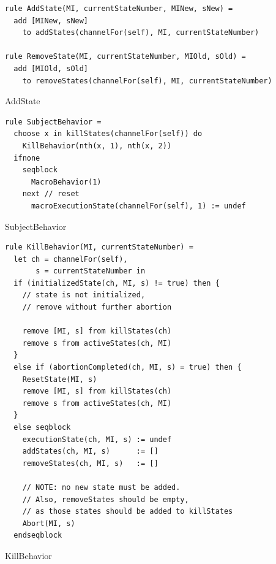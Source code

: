 \begin{listing}[H]
\begin{verbatim}
rule AddState(MI, currentStateNumber, MINew, sNew) =
  add [MINew, sNew]
    to addStates(channelFor(self), MI, currentStateNumber)

rule RemoveState(MI, currentStateNumber, MIOld, sOld) =
  add [MIOld, sOld]
    to removeStates(channelFor(self), MI, currentStateNumber)
\end{verbatim}
\caption{AddState}
\label{lst:asm:AddState}
\end{listing}







\begin{listing}[H]
\begin{verbatim}
rule SubjectBehavior =
  choose x in killStates(channelFor(self)) do
    KillBehavior(nth(x, 1), nth(x, 2))
  ifnone
    seqblock
      MacroBehavior(1)
    next // reset
      macroExecutionState(channelFor(self), 1) := undef
\end{verbatim}
\caption{SubjectBehavior}
\label{lst:asm:SubjectBehavior}
\end{listing}




\begin{listing}[H]
\begin{verbatim}
rule KillBehavior(MI, currentStateNumber) =
  let ch = channelFor(self),
       s = currentStateNumber in
  if (initializedState(ch, MI, s) != true) then {
    // state is not initialized,
    // remove without further abortion

    remove [MI, s] from killStates(ch)
    remove s from activeStates(ch, MI)
  }
  else if (abortionCompleted(ch, MI, s) = true) then {
    ResetState(MI, s)
    remove [MI, s] from killStates(ch)
    remove s from activeStates(ch, MI)
  }
  else seqblock
    executionState(ch, MI, s) := undef
    addStates(ch, MI, s)      := []
    removeStates(ch, MI, s)   := []

    // NOTE: no new state must be added.
    // Also, removeStates should be empty,
    // as those states should be added to killStates
    Abort(MI, s)
  endseqblock
\end{verbatim}
\caption{KillBehavior}
\label{lst:asm:KillBehavior}
\end{listing}





